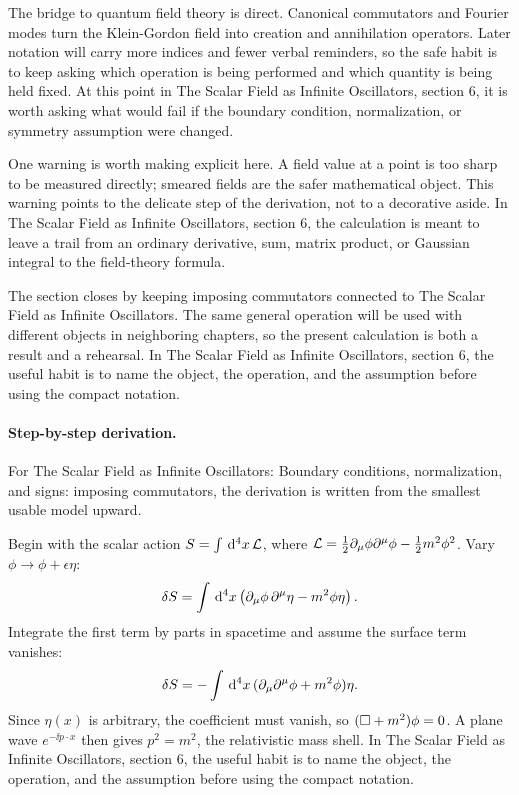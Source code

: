 The bridge to quantum field theory is direct.  Canonical commutators and Fourier modes turn the Klein-Gordon field into creation and annihilation operators.  Later notation will carry more indices and fewer verbal reminders, so the safe habit is to keep asking which operation is being performed and which quantity is being held fixed.  At this point in The Scalar Field as Infinite Oscillators, section 6, it is worth asking what would fail if the boundary condition, normalization, or symmetry assumption were changed.

One warning is worth making explicit here.  A field value at a point is too sharp to be measured directly; smeared fields are the safer mathematical object.  This warning points to the delicate step of the derivation, not to a decorative aside.  In The Scalar Field as Infinite Oscillators, section 6, the calculation is meant to leave a trail from an ordinary derivative, sum, matrix product, or Gaussian integral to the field-theory formula.

The section closes by keeping imposing commutators connected to The Scalar Field as Infinite Oscillators.  The same general operation will be used with different objects in neighboring chapters, so the present calculation is both a result and a rehearsal.  In The Scalar Field as Infinite Oscillators, section 6, the useful habit is to name the object, the operation, and the assumption before using the compact notation.



\paragraph{Step-by-step derivation.}

For The Scalar Field as Infinite Oscillators: Boundary conditions, normalization, and signs: imposing commutators, the derivation is written from the smallest usable model upward.

Begin with the scalar action \(S=\int\,\mathrm d^4x\,\mathcal L\), where \(\mathcal L=\frac12\partial_\mu\phi\partial^\mu\phi-\frac12m^2\phi^2\).  Vary \(\phi\to\phi+\epsilon\eta\):
\[
  \delta S=\int\,\mathrm d^4x\left(\partial_\mu\phi\,\partial^\mu\eta-m^2\phi\eta\right).
\]
Integrate the first term by parts in spacetime and assume the surface term vanishes:
\[
  \delta S=-\int\,\mathrm d^4x\,(\partial_\mu\partial^\mu\phi+m^2\phi)\eta.
\]
Since \(\eta(x)\) is arbitrary, the coefficient must vanish, so \((\Box+m^2)\phi=0\).  A plane wave \(e^{-\ii p\cdot x}\) then gives \(p^2=m^2\), the relativistic mass shell.  In The Scalar Field as Infinite Oscillators, section 6, the useful habit is to name the object, the operation, and the assumption before using the compact notation.

